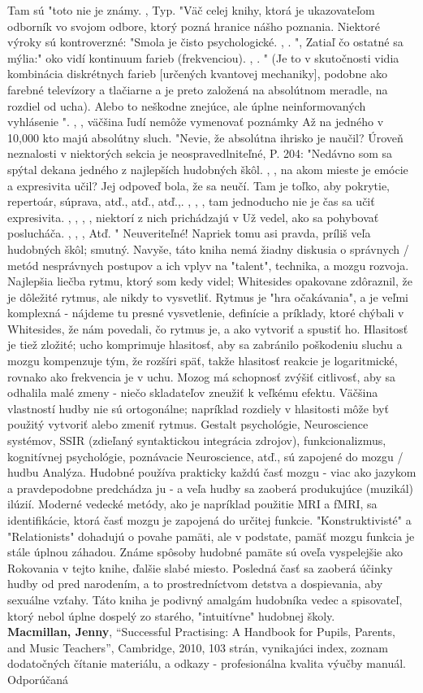 \documentclass[11pt,a4paper%
]{article}
\begin{document}
Tam sú "toto nie je známy. , Typ. "Väč celej knihy, ktorá je ukazovateľom
odborník vo svojom odbore, ktorý pozná hranice nášho poznania. Niektoré výroky sú kontroverzné: "Smola je čisto psychologické. , . ", Zatiaľ čo ostatné sa mýlia:" oko vidí kontinuum farieb (frekvenciou). , . "
(Je to v skutočnosti vidia kombinácia diskrétnych farieb [určených kvantovej mechaniky], podobne ako farebné televízory a tlačiarne a je preto založená na absolútnom meradle, na rozdiel od ucha). Alebo to neškodne znejúce, ale úplne neinformovaných vyhlásenie ". , , väčšina ľudí nemôže vymenovať poznámky Až na jedného v 10,000 kto majú absolútny sluch. "Nevie, že absolútna ihrisko je naučil? Úroveň neznalosti v niektorých sekcia je neospravedlniteľné, P. 204:
"Nedávno som sa spýtal dekana jedného z najlepších hudobných škôl. , , na akom mieste je emócie a
expresivita učil? Jej odpoveď bola, že sa neučí. Tam je toľko, aby pokrytie, repertoár,
súprava, atď., atď., atď.,. , , , tam jednoducho nie je čas sa učiť expresivita. , , , , niektorí z nich prichádzajú v Už vedel, ako sa pohybovať poslucháča. , , , Atď. "
Neuveriteľné! Napriek tomu asi pravda, príliš veľa hudobných škôl; smutný. Navyše, táto kniha nemá žiadny diskusia o správnych / metód nesprávnych postupov a ich vplyv na "talent", technika, a mozgu rozvoja.
Najlepšia liečba rytmu, ktorý som kedy videl; Whitesides opakovane zdôraznil, že je dôležité rytmus, ale nikdy to vysvetliť. Rytmus je "hra očakávania", a je veľmi komplexná - nájdeme tu presné vysvetlenie, definície a príklady, ktoré chýbali v Whitesides, že nám povedali, čo rytmus je, a ako vytvoriť a spustiť ho. Hlasitosť je tiež zložité; ucho komprimuje hlasitosť, aby sa zabránilo poškodeniu sluchu a mozgu kompenzuje tým, že rozšíri späť, takže hlasitosť reakcie je logaritmické, rovnako ako frekvencia je v uchu.
Mozog má schopnosť zvýšiť citlivosť, aby sa odhalila malé zmeny - niečo skladateľov zneužiť k veľkému efektu. Väčšina vlastností hudby nie sú ortogonálne; napríklad rozdiely v hlasitosti môže byť použitý vytvoriť alebo zmeniť rytmus.
Gestalt psychológie, Neuroscience systémov, SSIR (zdieľaný syntaktickou integrácia zdrojov),
funkcionalizmus, kognitívnej psychológie, poznávacie Neuroscience, atď., sú zapojené do mozgu / hudbu Analýza. Hudobné používa prakticky každú časť mozgu - viac ako jazykom a pravdepodobne predchádza ju - a veľa hudby sa zaoberá produkujúce (muzikál) ilúzií. Moderné vedecké metódy, ako je napríklad použitie MRI a fMRI, sa identifikácie, ktorá časť mozgu je zapojená do určitej funkcie.
"Konstruktivisté" a "Relationists" dohadujú o povahe pamäti, ale v podstate, pamäť mozgu funkcia je stále úplnou záhadou. Známe spôsoby hudobné pamäte sú oveľa vyspelejšie ako Rokovania v tejto knihe, ďalšie slabé miesto. Posledná časť sa zaoberá účinky hudby od pred narodením, a to prostredníctvom detstva a dospievania, aby sexuálne vzťahy.
Táto kniha je podivný amalgám hudobníka vedec a spisovateľ, ktorý nebol úplne dospelý
zo starého, "intuitívne" hudobnej školy.
\medskip\\
\textbf{Macmillan, Jenny}, “Successful Practising: A Handbook for Pupils, Parents, and Music Teachers”, Cambridge, 2010, 103 strán, vynikajúci index, zoznam dodatočných čítanie materiálu, a odkazy - profesionálna kvalita výučby manuál. Odporúčaná
\end{document}
